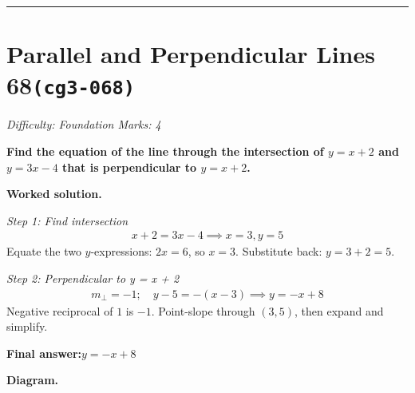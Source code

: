 \documentclass[11pt]{article}
\newcommand{\question}[1]{\par\medskip\noindent\textbf{#1}\par}
\begin{document}
\medskip\hrule

\section*{Parallel and Perpendicular Lines 68\quad\small\texttt{(cg3-068)}}
\textit{Difficulty: Foundation \quad\textbar\quad Marks: 4}

\question{Find the equation of the line through the intersection of \( y = x + 2 \) and \( y = 3x - 4 \) that is perpendicular to \( y = x + 2 \).}

\textbf{Worked solution.}

\textit{Step 1: Find intersection}
\[\begin{gathered}
x + 2 = 3x - 4 \implies x = 3, y = 5
\end{gathered}\]
Equate the two \( y \)-expressions: \( 2x = 6 \), so \( x = 3 \). Substitute back: \( y = 3 + 2 = 5 \).

\textit{Step 2: Perpendicular to y = x + 2}
\[\begin{gathered}
m_{\perp} = -1; \quad y - 5 = -(x - 3) \implies y = -x + 8
\end{gathered}\]
Negative reciprocal of \( 1 \) is \( -1 \). Point-slope through \( (3, 5) \), then expand and simplify.

\begin{answerbox}
\textbf{Final answer:}\quad \(\displaystyle y = -x + 8\)
\end{answerbox}
\textbf{Diagram.}
\end{document}
